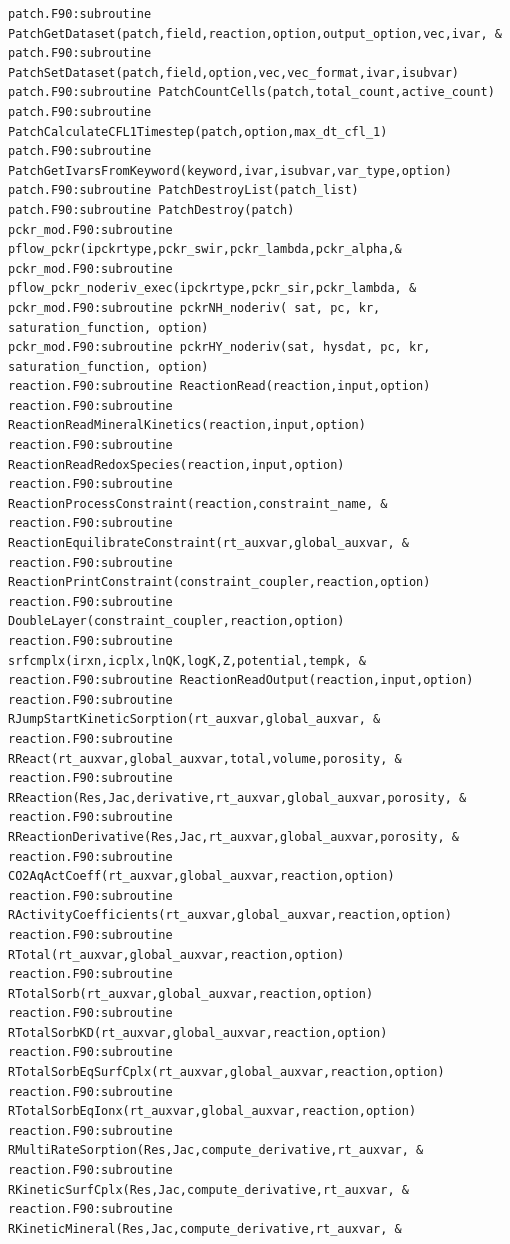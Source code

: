 \documentclass[12pt]{article}
\begin{document}
\begin{verbatim}
patch.F90:subroutine PatchGetDataset(patch,field,reaction,option,output_option,vec,ivar, &
patch.F90:subroutine PatchSetDataset(patch,field,option,vec,vec_format,ivar,isubvar)
patch.F90:subroutine PatchCountCells(patch,total_count,active_count)
patch.F90:subroutine PatchCalculateCFL1Timestep(patch,option,max_dt_cfl_1)
patch.F90:subroutine PatchGetIvarsFromKeyword(keyword,ivar,isubvar,var_type,option)
patch.F90:subroutine PatchDestroyList(patch_list)
patch.F90:subroutine PatchDestroy(patch)
pckr_mod.F90:subroutine pflow_pckr(ipckrtype,pckr_swir,pckr_lambda,pckr_alpha,&
pckr_mod.F90:subroutine pflow_pckr_noderiv_exec(ipckrtype,pckr_sir,pckr_lambda, &
pckr_mod.F90:subroutine pckrNH_noderiv( sat, pc, kr, saturation_function, option)
pckr_mod.F90:subroutine pckrHY_noderiv(sat, hysdat, pc, kr, saturation_function, option)
reaction.F90:subroutine ReactionRead(reaction,input,option)
reaction.F90:subroutine ReactionReadMineralKinetics(reaction,input,option)
reaction.F90:subroutine ReactionReadRedoxSpecies(reaction,input,option)
reaction.F90:subroutine ReactionProcessConstraint(reaction,constraint_name, &
reaction.F90:subroutine ReactionEquilibrateConstraint(rt_auxvar,global_auxvar, &
reaction.F90:subroutine ReactionPrintConstraint(constraint_coupler,reaction,option)
reaction.F90:subroutine DoubleLayer(constraint_coupler,reaction,option)
reaction.F90:subroutine srfcmplx(irxn,icplx,lnQK,logK,Z,potential,tempk, &
reaction.F90:subroutine ReactionReadOutput(reaction,input,option)
reaction.F90:subroutine RJumpStartKineticSorption(rt_auxvar,global_auxvar, &
reaction.F90:subroutine RReact(rt_auxvar,global_auxvar,total,volume,porosity, &
reaction.F90:subroutine RReaction(Res,Jac,derivative,rt_auxvar,global_auxvar,porosity, &
reaction.F90:subroutine RReactionDerivative(Res,Jac,rt_auxvar,global_auxvar,porosity, &
reaction.F90:subroutine CO2AqActCoeff(rt_auxvar,global_auxvar,reaction,option)
reaction.F90:subroutine RActivityCoefficients(rt_auxvar,global_auxvar,reaction,option)
reaction.F90:subroutine RTotal(rt_auxvar,global_auxvar,reaction,option)
reaction.F90:subroutine RTotalSorb(rt_auxvar,global_auxvar,reaction,option)
reaction.F90:subroutine RTotalSorbKD(rt_auxvar,global_auxvar,reaction,option)
reaction.F90:subroutine RTotalSorbEqSurfCplx(rt_auxvar,global_auxvar,reaction,option)
reaction.F90:subroutine RTotalSorbEqIonx(rt_auxvar,global_auxvar,reaction,option)
reaction.F90:subroutine RMultiRateSorption(Res,Jac,compute_derivative,rt_auxvar, &
reaction.F90:subroutine RKineticSurfCplx(Res,Jac,compute_derivative,rt_auxvar, &
reaction.F90:subroutine RKineticMineral(Res,Jac,compute_derivative,rt_auxvar, &

\end{verbatim}
\end{document}

